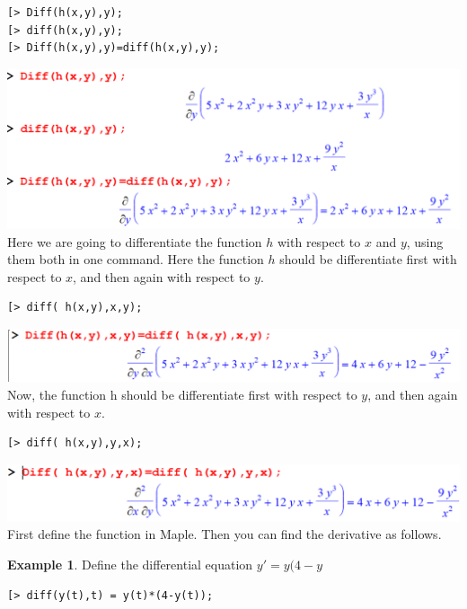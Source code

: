 \documentclass[
]{book}
\theoremstyle{definition}
\theoremstyle{definition}
\newtheorem{example}{Example}[chapter]
\theoremstyle{definition}
\theoremstyle{definition}
\theoremstyle{remark}
\begin{document}
\begin{verbatim}
[> Diff(h(x,y),y);
[> diff(h(x,y),y);
[> Diff(h(x,y),y)=diff(h(x,y),y);
\end{verbatim}

\includegraphics{figures/Diff/Diff 6.1 -4.png}
Here we are going to differentiate the function \(h\) with respect to \(x\) and \(y\), using them both in one command. Here the function \(h\) should be differentiate first with respect to \(x\), and then again with respect to \(y\).

\begin{verbatim}
[> diff( h(x,y),x,y);
\end{verbatim}

\includegraphics{figures/Diff/Diff 6.1 -5.png}
Now, the function h should be differentiate first with respect to \(y\), and then again with respect to \(x\).

\begin{verbatim}
[> diff( h(x,y),y,x);
\end{verbatim}

\includegraphics{figures/Diff/Diff 6.1 -6.png}
First define the function in Maple. Then you can find the derivative as follows.

\begin{example}
\protect\hypertarget{exm:unnamed-chunk-42}{}\label{exm:unnamed-chunk-42}Define the differential equation \(y' =y(4-y\)
\end{example}

\begin{verbatim}
[> diff(y(t),t) = y(t)*(4-y(t));
\end{verbatim}
\end{document}
